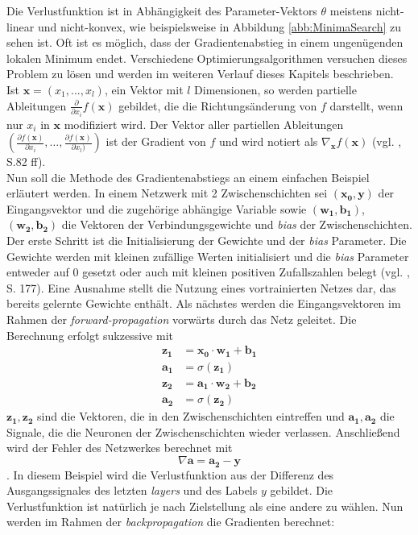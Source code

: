 \documentclass[a4paper,11pt]{article}
\begin{document}
Die Verlustfunktion ist in Abhängigkeit des Parameter-Vektors $\theta$ meistens nicht-linear und nicht-konvex, wie beispielsweise in Abbildung \ref{abb:MinimaSearch} zu sehen ist. Oft ist es möglich, dass der Gradientenabstieg in einem ungenügenden lokalen Minimum endet. Verschiedene Optimierungsalgorithmen versuchen dieses Problem zu lösen und werden im weiteren Verlauf dieses Kapitels beschrieben.\\

Ist $\bm{x} = (x_1, ..., x_l)$, ein Vektor mit $l$ Dimensionen, so werden partielle Ableitungen $\frac{\partial}{\partial x_i} f(\bm{x})$ gebildet, die die Richtungsänderung von $f$ darstellt, wenn nur $x_i$ in $\bm{x}$ modifiziert wird. Der Vektor aller partiellen Ableitungen $(\frac{\partial f(\bm{x})}{\partial x_i}, \dots, \frac{\partial f(\bm{x})}{\partial x_l)})$ ist der Gradient von $f$ und wird notiert als $\nabla_{\bm{x}} f(\bm{x})$ (vgl. \cite{deepL}, S.82 ff).\\

Nun soll die Methode des Gradientenabstiegs an einem einfachen Beispiel erläutert werden. In einem Netzwerk mit 2 Zwischenschichten sei $(\bm{x_0}, \bm{y})$ der Eingangsvektor und die zugehörige abhängige Variable sowie $(\bm{w_1}, \bm{b_1})$, $(\bm{w_2}, \bm{b_2})$ die Vektoren der Verbindungsgewichte und \textit{bias} der Zwischenschichten. Der erste Schritt ist die Initialisierung der Gewichte und der \textit{bias} Parameter. Die Gewichte werden mit kleinen zufällige Werten initialisiert und die \textit{bias} Parameter entweder auf $0$ gesetzt oder auch mit kleinen positiven Zufallszahlen belegt (vgl. \cite{deepL}, S. 177). Eine Ausnahme stellt die Nutzung eines vortrainierten Netzes dar, das bereits gelernte Gewichte enthält. Als nächstes werden die Eingangsvektoren im Rahmen der \textit{forward-propagation} vorwärts durch das Netz geleitet. Die Berechnung erfolgt sukzessive mit
\begin{align*}
    \bm{z_1} &= \bm{x_0} \cdot \bm{w_1} + \bm{b_1} \\
    \bm{a_1} &= \sigma(\bm{z_1}) \\
    \bm{z_2} &= \bm{a_1} \cdot \bm{w_2} + \bm{b_2} \\
    \bm{a_2} &= \sigma (\bm{z_2})
\end{align*}{}
$\bm{z_1}, \bm{z_2}$ sind die Vektoren, die in den Zwischenschichten eintreffen und $\bm{a_1}, \bm{a_2}$ die Signale, die die Neuronen der Zwischenschichten wieder verlassen. Anschließend wird der Fehler des Netzwerkes berechnet mit 
\[\nabla \bm{a} = \bm{a_2} - \bm{y} \].
In diesem Beispiel wird die Verlustfunktion aus der Differenz des Ausgangssignales des letzten \textit{layers} und des Labels $y$ gebildet. Die Verlustfunktion ist natürlich je nach Zielstellung als eine andere zu wählen. Nun werden im Rahmen der \textit{backpropagation} die Gradienten berechnet:
\end{document}
